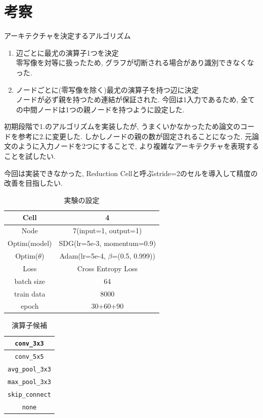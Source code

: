 \documentclass[twocolumn]{jarticle}     %
\begin{document}
\section{考察}
アーキテクチャを決定するアルゴリズム
\begin{enumerate}
  \item 辺ごとに最尤の演算子1つを決定\\
  零写像を対等に扱ったため, グラフが切断される場合があり識別できなくなった.
  \item ノードごとに(零写像を除く)最尤の演算子を持つ辺に決定\\
  ノードが必ず親を持つため連結が保証された.
  今回は1入力であるため, 全ての中間ノードは1つの親ノードを持つように設定した.
\end{enumerate}

初期段階で1.のアルゴリズムを実装したが, うまくいかなかったため論文\cite{DBLP:journals/corr/abs-1806-09055}のコードを参考に2.に変更した.
しかしノードの親の数が固定されることになった.
元論文のように入力ノードを2つにすることで, より複雑なアーキテクチャを表現することを試したい.

今回は実装できなかった, Reduction Cellと呼ぶstride=2のセルを導入して精度の改善を目指したい.

\begin{table}[tb]
  \begin{center}
    \caption{実験の設定}
    \begin{tabular}{|c|c|} \hline
      Cell & 4 \\ \hline
      Node & 7(input=1, output=1) \\ \hline
      Optim(model) & SDG(lr=5e-3, momentum=0.9) \\ \hline
      Optim($\theta$) & Adam(lr=5e-4, $\beta$=(0.5, 0.999)) \\ \hline
      Loss & Cross Entropy Loss \\ \hline
      batch size & 64 \\ \hline
      train data & 8000 \\ \hline
      epoch & 30+60+90 \\ \hline
    \end{tabular}
    \label{tab:setting}
  \end{center}
\end{table}

\begin{table}[tb]
  \begin{center}
    \caption{演算子候補}
    \begin{tabular}{|c|} \hline
      \verb|conv_3x3| \\ \hline
      \verb|conv_5x5| \\ \hline
      \verb|avg_pool_3x3| \\ \hline
      \verb|max_pool_3x3| \\ \hline
      \verb|skip_connect| \\ \hline
      \verb|none| \\ \hline
    \end{tabular}
    \label{tab:ops}
  \end{center}
\end{table}
\end{document}
